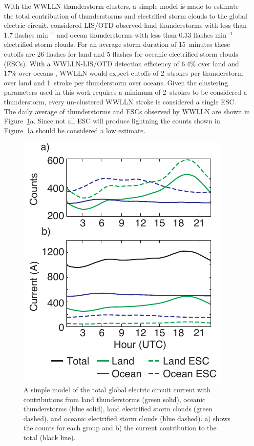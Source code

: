 With the WWLLN thunderstorm clusters, a simple model is made to estimate the total contribution of thunderstorms and electrified storm clouds to the global electric circuit.
\citet{Mach2011} considered LIS/OTD observed land thunderstorms with less than 1.7 flashes min$^{-1}$ and ocean thunderstorms with less than 0.33 flashes min$^{-1}$ electrified storm clouds.
For an average storm duration of 15~minutes these cutoffs are 26 flashes for land and 5 flashes for oceanic electrified storm clouds (ESCs).
With a WWLLN-LIS/OTD detection efficiency of 6.4\% over land and 17\% over oceans \citep{Rudlosky2013}, WWLLN would expect cutoffs of 2~strokes per thunderstorm over land and 1~stroke per thunderstorm over oceans.
Given the clustering parameters used in this work requires a minimum of 2~strokes to be considered a thunderstorm, every un-clustered WWLLN stroke is considered a single ESC.
The daily average of thunderstorms and ESCs observed by WWLLN are shown in Figure~\ref{gec:fig:wilson}a.
Since not all ESC will produce lightning the counts shown in Figure~\ref{gec:fig:wilson}a should be considered a low estimate.

  \begin{figure}[ht!]
    \centering
    \includegraphics[scale=1]{GEC/Figures/wilson.pdf}
    \caption{A simple model of the total global electric circuit current with contributions from land thunderstorms (green solid), oceanic thunderstorms (blue solid), land electrified storm clouds (green dashed), and oceanic electrified storm clouds (blue dashed).
    		a) shows the counts for each group and b) the current contribution to the total (black line).
		}
    \label{gec:fig:wilson}
 \end{figure}

